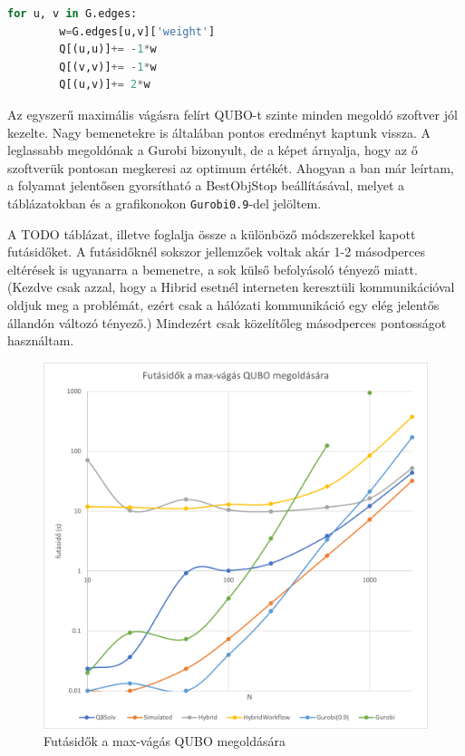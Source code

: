 \begin{lstlisting}[language=python,caption=Max-cut QUBO,label=code:maxCutQUBO]
	for u, v in G.edges:
		w=G.edges[u,v]['weight']
		Q[(u,u)]+= -1*w
		Q[(v,v)]+= -1*w
		Q[(u,v)]+= 2*w
\end{lstlisting}


Az egyszerű maximális vágásra felírt QUBO-t szinte minden megoldó szoftver jól kezelte. Nagy bemenetekre is általában pontos eredményt kaptunk vissza. A leglassabb megoldónak a Gurobi bizonyult, de a képet árnyalja, hogy az ő szoftverük pontosan megkeresi az optimum értékét. Ahogyan a ban már leírtam, a folyamat jelentősen gyorsítható a BestObjStop beállításával, melyet a táblázatokban és a grafikonokon \verb+Gurobi0.9+-del jelöltem.

A TODO táblázat, illetve  foglalja össze a különböző módszerekkel kapott futásidőket. A futásidőknél sokszor jellemzőek voltak akár 1-2 másodperces eltérések is ugyanarra a bemenetre, a sok külső befolyásoló tényező miatt. (Kezdve csak azzal, hogy a Hibrid esetnél interneten keresztüli kommunikációval oldjuk meg a problémát, ezért csak a hálózati kommunikáció egy elég jelentős állandón változó tényező.) Mindezért csak közelítőleg másodperces pontosságot használtam.



\begin{figure}[!ht]
	\centering
	\includegraphics[width=150mm, keepaspectratio]{figures/diagrams/maxCutQUBO.png}
	\caption{Futásidők a max-vágás QUBO megoldására}
	\label{fig:maxCutQUBO}
\end{figure}

